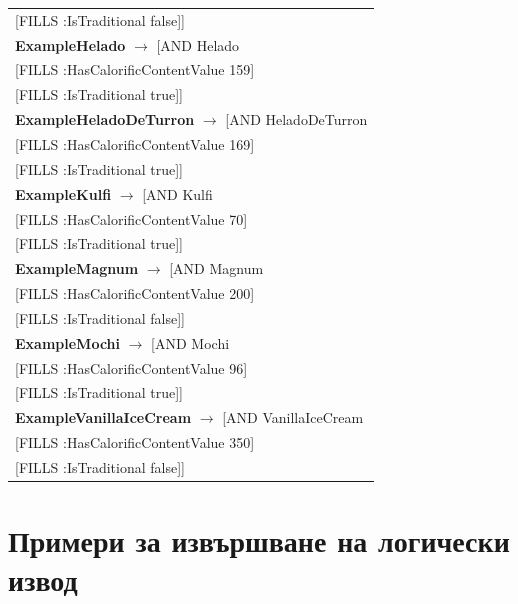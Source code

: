 \documentclass[12pt]{article}
\newcommand*{\MyIndent}{\hspace*{7em}}
\begin{document}
\begin{tabularx}{1\textwidth}{@{}X@{}}
                            \MyIndent [FILLS :IsTraditional false]]
                            \tabularnewline
            \textbf{ExampleHelado} $\rightarrow$ [AND Helado \\
                            \MyIndent [FILLS :HasCalorificContentValue 159] \\
                            \MyIndent [FILLS :IsTraditional true]]
                            \tabularnewline
            \textbf{ExampleHeladoDeTurron} $\rightarrow$ [AND HeladoDeTurron \\
                            \MyIndent [FILLS :HasCalorificContentValue 169] \\
                            \MyIndent [FILLS :IsTraditional true]]
                            \tabularnewline
            \textbf{ExampleKulfi} $\rightarrow$ [AND Kulfi \\
                            \MyIndent [FILLS :HasCalorificContentValue 70] \\
                            \MyIndent [FILLS :IsTraditional true]]
                            \tabularnewline
            \textbf{ExampleMagnum} $\rightarrow$ [AND Magnum \\
                            \MyIndent [FILLS :HasCalorificContentValue 200] \\
                            \MyIndent [FILLS :IsTraditional false]]
                            \tabularnewline
            \textbf{ExampleMochi} $\rightarrow$ [AND Mochi \\
                            \MyIndent [FILLS :HasCalorificContentValue 96] \\
                            \MyIndent [FILLS :IsTraditional true]]
                            \tabularnewline
            \textbf{ExampleVanillaIceCream} $\rightarrow$ [AND VanillaIceCream \\
                            \MyIndent [FILLS :HasCalorificContentValue 350] \\
                            \MyIndent [FILLS :IsTraditional false]]
                            \tabularnewline


        \bottomrule
        \end{tabularx}

  

\section{Примери за извършване на логически извод}
\end{document}
